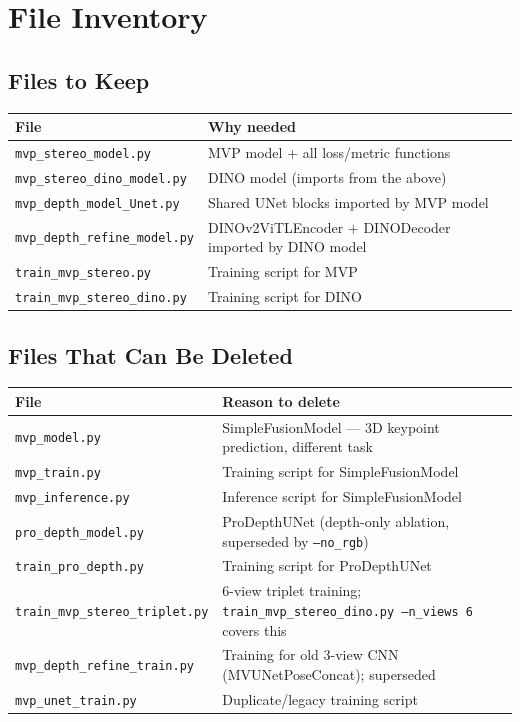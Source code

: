 \documentclass[11pt]{article}
\begin{document}
\section{File Inventory}

\subsection{Files to Keep}

\begin{center}
\begin{tabular}{ll}
\toprule
\textbf{File} & \textbf{Why needed} \\
\midrule
\texttt{mvp\_stereo\_model.py}       & MVP model + all loss/metric functions \\
\texttt{mvp\_stereo\_dino\_model.py} & DINO model (imports from the above) \\
\texttt{mvp\_depth\_model\_Unet.py}  & Shared UNet blocks imported by MVP model \\
\texttt{mvp\_depth\_refine\_model.py}& DINOv2ViTLEncoder + DINODecoder imported by DINO model \\
\texttt{train\_mvp\_stereo.py}       & Training script for MVP \\
\texttt{train\_mvp\_stereo\_dino.py} & Training script for DINO \\
\bottomrule
\end{tabular}
\end{center}

\subsection{Files That Can Be Deleted}

\begin{center}
\begin{tabular}{ll}
\toprule
\textbf{File} & \textbf{Reason to delete} \\
\midrule
\texttt{mvp\_model.py}                & SimpleFusionModel --- 3D keypoint prediction, different task \\
\texttt{mvp\_train.py}                & Training script for SimpleFusionModel \\
\texttt{mvp\_inference.py}            & Inference script for SimpleFusionModel \\
\texttt{pro\_depth\_model.py}         & ProDepthUNet (depth-only ablation, superseded by \texttt{--no\_rgb}) \\
\texttt{train\_pro\_depth.py}         & Training script for ProDepthUNet \\
\texttt{train\_mvp\_stereo\_triplet.py} & 6-view triplet training; \texttt{train\_mvp\_stereo\_dino.py --n\_views 6} covers this \\
\texttt{mvp\_depth\_refine\_train.py} & Training for old 3-view CNN (MVUNetPoseConcat); superseded \\
\texttt{mvp\_unet\_train.py}          & Duplicate/legacy training script \\
\bottomrule
\end{tabular}
\end{center}
\end{document}
